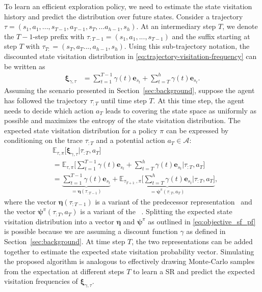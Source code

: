 \documentclass{article}
\theoremstyle{plain}
\theoremstyle{definition}
\theoremstyle{remark}
\begin{document}
To learn an efficient exploration policy, we need to estimate the state visitation history and predict the distribution over future states.
Consider a trajectory $\tau = (s_1,a_1,...,s_{T-1},a_{T-1},s_{T},...a_{h-1},s_{h})$. 
At an intermediary step $T$, we denote the $T-1$-step prefix with $\tau_{:T-1} = (s_1,a_1,...,s_{T-1})$ and the suffix starting at step $T$ with $\tau_{T:}=(s_T,a_T...,a_{h-1},s_{h})$. 
Using this sub-trajectory notation, the discounted state visitation distribution in \autoref{eq:trajectory-visitation-frequency} can be written as
\begin{align}
    \pmb{\xi}_{\gamma,\tau} &= \sum_{t=1}^{T-1} \gamma(t) \pmb{e}_{s_t} + \sum_{t=T}^h \gamma(t) \pmb{e}_{s_t}.
\end{align}
Assuming the scenario presented in Section~\ref{sec:background}, suppose the agent has followed the trajectory $\tau_{:T}$ until time step $T$.
At this time step, the agent needs to decide which action $a_T$ leads to covering the state space as uniformly as possible and maximizes the entropy of the state visitation distribution. 
The expected state visitation distribution for a policy $\pi$ can be expressed by conditioning on the trace $\tau_{:T}$ and a potential action $a_T \in \mathcal{A}$:
\begin{align}
    &\mathbb{E}_{\tau, \pi} \Big[ \pmb{\xi}_{\gamma,\tau} \Big| \tau_{:T}, a_T \Big] \\
    &=\mathbb{E}_{\tau, \pi} \Bigg[ \sum_{t=1}^{T-1} \gamma(t) \pmb{e}_{s_t} + \sum_{t=T}^h \gamma(t) \pmb{e}_{s_t} \Big| \tau_{:T}, a_T \Bigg] \\
    &= \underbrace{\sum_{t=1}^{T-1} \gamma(t) \pmb{e}_{s_t}}_{=\pmb{\eta}(\tau_{:T-1})} + \underbrace{\mathbb{E}_{\tau_{T+1:}, \pi} \Bigg[  \sum_{t=T}^h\gamma(t) \pmb{e}_{s_t} \Bigg| \tau_{:T},a_T \Bigg]}_{=\pmb{\psi}^\pi( \tau_{:T}, a_T )}\label{eq:objective_sf_pf} ,
\end{align}
where the vector $\pmb{\eta} (\tau_{:T-1})$ is a variant of the predecessor representation~\cite{vanhasselt2021expectedeligibilitytraces,bailey2022predecessor} and the vector $\pmb{\psi}^\pi(\tau_{:T},a_T)$ is a variant of the ~\cite{dayan1993improving}.
Splitting the expected state visitation distribution into a vector $\pmb{\eta}$ and $\pmb{\psi}^\pi$ as outlined in \autoref{eq:objective_sf_pf} is possible because we are assuming a discount function $\gamma$ as defined in Section~\ref{sec:background}.
At time step $T$, the two representations 
can be added together to estimate the expected state visitation probability vector.
Simulating the proposed algorithm is analogous to effectively drawing Monte-Carlo samples from the expectation at different steps $T$ to learn a SR and predict the expected visitation frequencies of $\pmb{\xi}_{\gamma,\tau}$.
\end{document}
